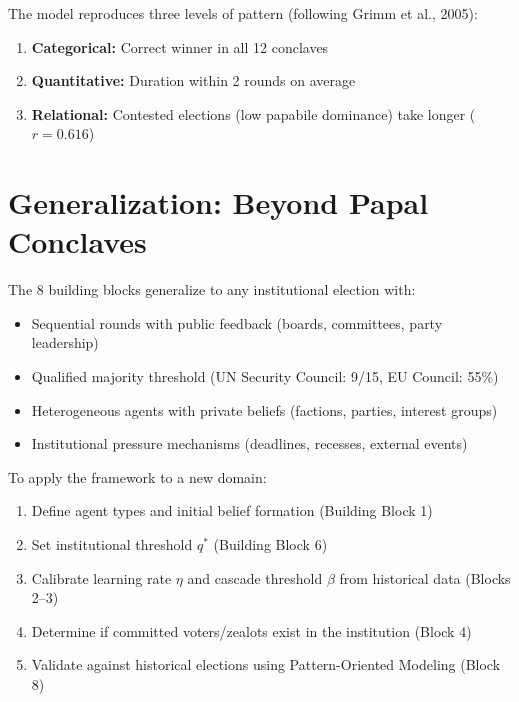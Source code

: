 The model reproduces three levels of pattern (following Grimm et al., 2005):
\begin{enumerate}[nosep]
\item \textbf{Categorical:} Correct winner in all 12 conclaves
\item \textbf{Quantitative:} Duration within 2 rounds on average
\item \textbf{Relational:} Contested elections (low papabile dominance) take longer ($r = 0.616$)
\end{enumerate}


\section{Generalization: Beyond Papal Conclaves}
\label{sec:bp-generalization}

The 8 building blocks generalize to any institutional election with:
\begin{itemize}[nosep]
\item Sequential rounds with public feedback (boards, committees, party leadership)
\item Qualified majority threshold (UN Security Council: 9/15, EU Council: 55\%)
\item Heterogeneous agents with private beliefs (factions, parties, interest groups)
\item Institutional pressure mechanisms (deadlines, recesses, external events)
\end{itemize}

To apply the framework to a new domain:
\begin{enumerate}[nosep]
\item Define agent types and initial belief formation (Building Block 1)
\item Set institutional threshold $q^*$ (Building Block 6)
\item Calibrate learning rate $\eta$ and cascade threshold $\beta$ from historical data (Blocks 2--3)
\item Determine if committed voters/zealots exist in the institution (Block 4)
\item Validate against historical elections using Pattern-Oriented Modeling (Block 8)
\end{enumerate}


